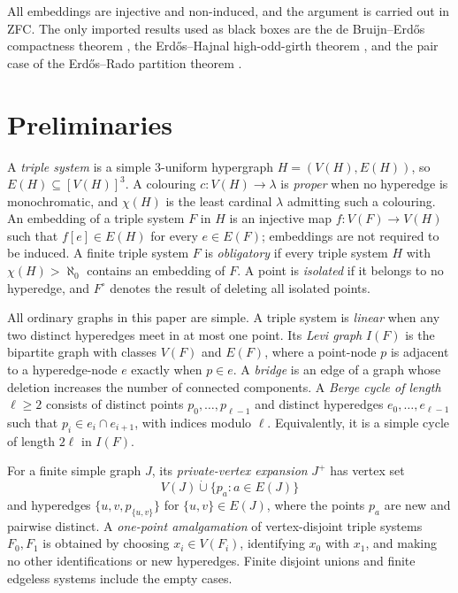 \documentclass[a4paper,11pt,reqno]{amsart}
\theoremstyle{plain}
\theoremstyle{definition}
\theoremstyle{remark}
\begin{document}
All embeddings are injective and non-induced, and the argument is carried out
in ZFC.  The only imported results used as black boxes are the de Bruijn--Erdős
compactness theorem \citep[Theorem~1, pp.~371--373]{debruijn1951}, the
Erdős--Hajnal high-odd-girth theorem
\citep[Theorem~7.4, p.~76]{erdoshajnal1966}, and the pair case of the
Erdős--Rado partition theorem
\citep[Theorem~4(i), formula~(95), p.~471]{erdosrado1956}.

\section{Preliminaries}\label{conventions-and-definitions}

A \emph{triple system} is a simple \(3\)-uniform hypergraph \(H=(V(H),E(H))\), so \(E(H)\subseteq[V(H)]^3\). A colouring \(c:V(H)\to\lambda\) is \emph{proper} when no hyperedge is monochromatic, and \(\chi(H)\) is the least cardinal \(\lambda\) admitting such a colouring. An embedding of a triple system \(F\) in \(H\) is an injective map \(f:V(F)\to V(H)\) such that \(f[e]\in E(H)\) for every \(e\in E(F)\); embeddings are not required to be induced. A finite triple system \(F\) is \emph{obligatory} if every triple system \(H\) with \(\chi(H)>\aleph_0\) contains an embedding of \(F\). A point is \emph{isolated} if it belongs to no hyperedge, and \(F^\circ\) denotes the result of deleting all isolated points.

All ordinary graphs in this paper are simple. A triple system is \emph{linear} when any two distinct hyperedges meet in at most one point. Its \emph{Levi graph} \(I(F)\) is the bipartite graph with classes \(V(F)\) and \(E(F)\), where a point-node \(p\) is adjacent to a hyperedge-node \(e\) exactly when \(p\in e\). A \emph{bridge} is an edge of a graph whose deletion increases the number of connected components. A \emph{Berge cycle of length} \(\ell\ge2\) consists of distinct points \(p_0,\ldots,p_{\ell-1}\) and distinct hyperedges \(e_0,\ldots,e_{\ell-1}\) such that \(p_i\in e_i\cap e_{i+1}\), with indices modulo \(\ell\). Equivalently, it is a simple cycle of length \(2\ell\) in \(I(F)\).

For a finite simple graph \(J\), its \emph{private-vertex expansion} \(J^+\) has vertex set
\[
V(J)\mathbin{\dot\cup}\{p_a:a\in E(J)\}
\]
and hyperedges \(\{u,v,p_{\{u,v\}}\}\) for \(\{u,v\}\in E(J)\), where the points \(p_a\) are new and pairwise distinct. A \emph{one-point amalgamation} of vertex-disjoint triple systems \(F_0,F_1\) is obtained by choosing \(x_i\in V(F_i)\), identifying \(x_0\) with \(x_1\), and making no other identifications or new hyperedges. Finite disjoint unions and finite edgeless systems include the empty cases.
\end{document}
